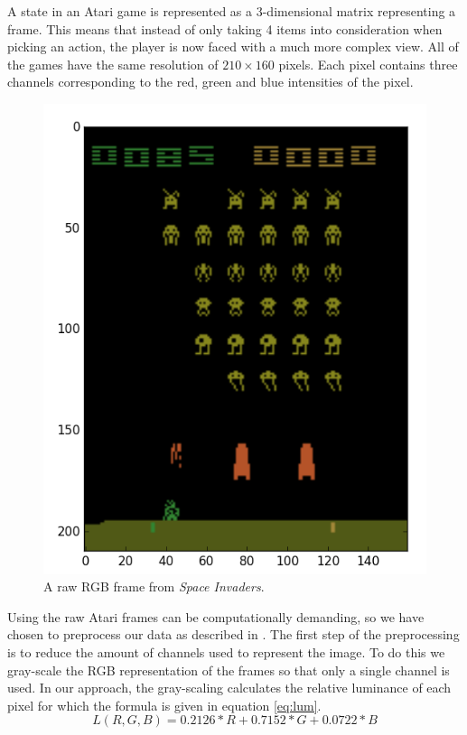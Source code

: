 \documentclass[11pt]{article}
\begin{document}
A state in an Atari game is represented as a 3-dimensional matrix representing a
frame.
This means that instead of only taking 4 items into consideration when picking an action,
the player is now faced with a much more complex view. 
All of the games have the same resolution of $210 \times 160$ pixels.
Each pixel contains three channels corresponding to the red, green and blue intensities of the pixel.
\begin{figure}[!h]
    \centering
    \includegraphics[scale=0.35]{include/space_invaders_1.png}
    \caption{A raw RGB frame from \textit{Space Invaders}.}
    \label{fig:si}
\end{figure}

Using the raw Atari frames can be computationally demanding, so we have chosen
to preprocess our data as described in \cite{dqn}. 
The first step of the preprocessing is to reduce the amount of channels used to
represent the image.
To do this we gray-scale the RGB representation of the frames so that only a single channel is used.
In our approach, the gray-scaling calculates the relative luminance\cite{luminance} of each pixel
for which the formula is given in equation \ref{eq:lum}.
\begin{equation}\label{eq:lum}
    L(R, G, B) = 0.2126*R + 0.7152*G + 0.0722*B
\end{equation}
\end{document}
